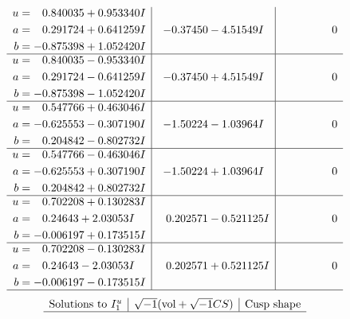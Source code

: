 \documentclass[1p]{elsarticle_modified}
\theoremstyle{definition}
\newcommand{\I}{\sqrt{-1}}
\begin{document}
$$\begin{array}{c|c|c}
\begin{aligned}
u &= \phantom{-}0.840035 + 0.953340 I \\
a &= \phantom{-}0.291724 + 0.641259 I \\
b &= -0.875398 + 1.052420 I\end{aligned}
 & -0.37450 - 4.51549 I & \phantom{-0.000000 } 0 \\ \hline\begin{aligned}
u &= \phantom{-}0.840035 - 0.953340 I \\
a &= \phantom{-}0.291724 - 0.641259 I \\
b &= -0.875398 - 1.052420 I\end{aligned}
 & -0.37450 + 4.51549 I & \phantom{-0.000000 } 0 \\ \hline\begin{aligned}
u &= \phantom{-}0.547766 + 0.463046 I \\
a &= -0.625553 - 0.307190 I \\
b &= \phantom{-}0.204842 - 0.802732 I\end{aligned}
 & -1.50224 - 1.03964 I & \phantom{-0.000000 } 0 \\ \hline\begin{aligned}
u &= \phantom{-}0.547766 - 0.463046 I \\
a &= -0.625553 + 0.307190 I \\
b &= \phantom{-}0.204842 + 0.802732 I\end{aligned}
 & -1.50224 + 1.03964 I & \phantom{-0.000000 } 0 \\ \hline\begin{aligned}
u &= \phantom{-}0.702208 + 0.130283 I \\
a &= \phantom{-}0.24643 + 2.03053 I \\
b &= -0.006197 + 0.173515 I\end{aligned}
 & \phantom{-}0.202571 - 0.521125 I & \phantom{-0.000000 } 0 \\ \hline\begin{aligned}
u &= \phantom{-}0.702208 - 0.130283 I \\
a &= \phantom{-}0.24643 - 2.03053 I \\
b &= -0.006197 - 0.173515 I\end{aligned}
 & \phantom{-}0.202571 + 0.521125 I & \phantom{-0.000000 } 0\\
 \hline 
 \end{array}$$\newpage$$\begin{array}{c|c|c}  
\text{Solutions to }I^u_{1}& \I (\text{vol} + \sqrt{-1}CS) & \text{Cusp shape}\\
 \hline 

\end{array}$$
\end{document}
